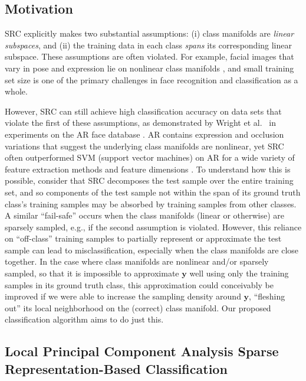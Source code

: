 \documentclass[review]{elsarticle}
\begin{document}
\subsection{Motivation}

SRC explicitly makes two substantial assumptions: (i) class manifolds are \emph{linear subspaces}, and (ii) the training data in each class \emph{spans} its corresponding linear subspace. These assumptions are often violated. For example, facial images that vary in pose and expression lie on nonlinear class manifolds \cite{row:lle,he:lapface}, and small training set size is one of the primary challenges in face recognition and classification as a whole. 

However, SRC can still achieve high classification accuracy on data sets that violate the first of these assumptions, as demonstrated by Wright et al.\ \cite{wri:src} in experiments on the AR face database \cite{AR:face}. AR contains expression and occlusion variations that suggest the underlying class manifolds are nonlinear, yet SRC often outperformed SVM (support vector machines) on AR for a wide variety of feature extraction methods and feature dimensions \cite{wri:src}. To understand how this is possible, consider that SRC decomposes the test sample over the entire training set, and so components of the test sample not within the span of its ground truth class's training samples may be absorbed by training samples from other classes. A similar ``fail-safe'' occurs when the class manifolds (linear or otherwise) are sparsely sampled, e.g., if the second assumption is violated. However, this reliance on ``off-class'' training samples to partially represent or approximate the test sample can lead to misclassification, especially when the class manifolds are close together. In the case where class manifolds are nonlinear and/or sparsely sampled, so that it is impossible to approximate $\bm{y}$ well using only the training samples in its ground truth class, this approximation could conceivably be improved if we were able to increase the sampling density around $\bm{y}$, ``fleshing out'' its local neighborhood on the (correct) class manifold. Our proposed classification algorithm aims to do just this. 




\subsection{Local Principal Component Analysis Sparse Representation-Based Classification}
\end{document}
